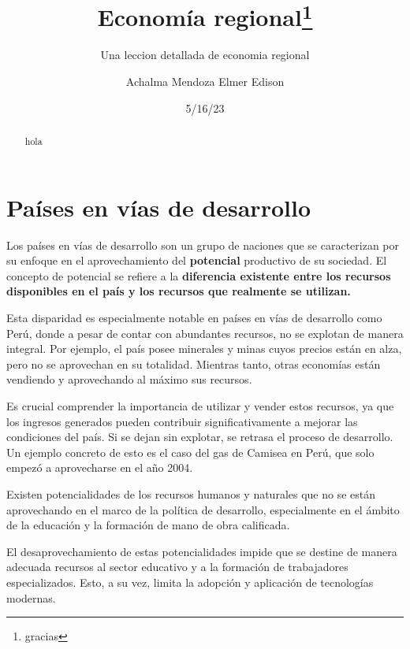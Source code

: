 \documentclass[
  a4paper,
]{article}
\title{Economía regional\thanks{gracias}}
\subtitle{Una leccion detallada de economia regional}
\author{Achalma Mendoza Elmer Edison}
\date{5/16/23}
\renewcommand*\contentsname{Table of contents}
\newcommand\contentsname{Table of contents}
\begin{document}
\maketitle
\begin{abstract}
hola
\end{abstract}
\ifdefined\Shaded\renewenvironment{Shaded}{\begin{tcolorbox}[boxrule=0pt, frame hidden, sharp corners, borderline west={3pt}{0pt}{shadecolor}, interior hidden, enhanced, breakable]}{\end{tcolorbox}}\fi

\renewcommand*\contentsname{Contenidos}
{
\hypersetup{linkcolor=}
\setcounter{tocdepth}{3}
\tableofcontents
}
\listoffigures
\listoftables
\hypertarget{pauxedses-en-vuxedas-de-desarrollo}{%
\section{Países en vías de
desarrollo}\label{pauxedses-en-vuxedas-de-desarrollo}}

Los países en vías de desarrollo son un grupo de naciones que se
caracterizan por su enfoque en el aprovechamiento del \textbf{potencial}
productivo de su sociedad. El concepto de potencial se refiere a la
\textbf{diferencia existente entre los recursos disponibles en el país y
los recursos que realmente se utilizan.}

Esta disparidad es especialmente notable en países en vías de desarrollo
como Perú, donde a pesar de contar con abundantes recursos, no se
explotan de manera integral. Por ejemplo, el país posee minerales y
minas cuyos precios están en alza, pero no se aprovechan en su
totalidad. Mientras tanto, otras economías están vendiendo y
aprovechando al máximo sus recursos.

Es crucial comprender la importancia de utilizar y vender estos
recursos, ya que los ingresos generados pueden contribuir
significativamente a mejorar las condiciones del país. Si se dejan sin
explotar, se retrasa el proceso de desarrollo. Un ejemplo concreto de
esto es el caso del gas de Camisea en Perú, que solo empezó a
aprovecharse en el año 2004.

Existen potencialidades de los recursos humanos y naturales que no se
están aprovechando en el marco de la política de desarrollo,
especialmente en el ámbito de la educación y la formación de mano de
obra calificada.

El desaprovechamiento de estas potencialidades impide que se destine de
manera adecuada recursos al sector educativo y a la formación de
trabajadores especializados. Esto, a su vez, limita la adopción y
aplicación de tecnologías modernas.
\end{document}
